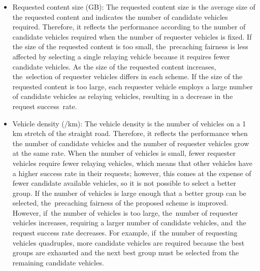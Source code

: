 \documentclass[sensors,aricle,accept,pdftex,moreauthors]{Definitions/mdpi}
\begin{document}
{\begin{itemize}
    \item Requested content size (GB):
    The requested content size is the average size of the requested content and indicates the number of candidate vehicles required.
    Therefore, it reflects the performance according to the number of candidate vehicles required when the number of requester vehicles is fixed.
    If the size of the requested content is too small, the~precaching fairness is less affected by selecting a single relaying vehicle because it requires fewer candidate vehicles.
    As the size of the requested content increases, the~selection of requester vehicles differs in each scheme.
    If the size of the requested content is too large, each requester vehicle employs a large number of candidate vehicles as relaying vehicles, resulting in a decrease in the request success~rate.

    \item Vehicle density (/km):
    The vehicle density is the number of vehicles on a 1 km stretch of the straight road.
    Therefore, it reflects the performance when the number of candidate vehicles and the number of requester vehicles grow at the same rate.
    When the number of vehicles is small, fewer requester vehicles require fewer relaying vehicles, which means that other vehicles have a higher success rate in their requests; however, this comes at the expense of fewer candidate available vehicles, so it is not possible to select a better group.
    If the number of vehicles is large enough that a better group can be selected, the~precaching fairness of the proposed scheme is improved.
    However, if~the number of vehicles is too large, the~number of requester vehicles increases, requiring a larger number of candidate vehicles, and~the request success rate decreases.
    For example, if~the number of requesting vehicles quadruples, more candidate vehicles are required because the best groups are exhausted and the next best group must be selected from the remaining candidate vehicles.
\end{itemize}  \newpage


 

}
\end{document}
